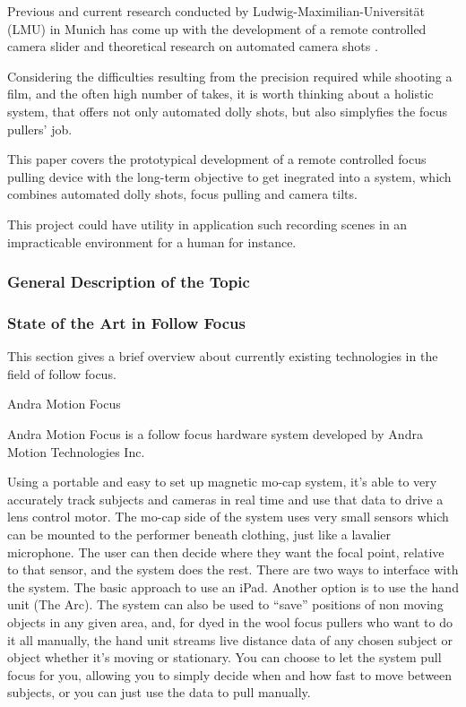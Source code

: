 \documentclass{sigchi}
\begin{document}
Previous and current research conducted by Ludwig-Maximilian-Universit\"at (LMU) in Munich has come up with the development of a remote controlled camera slider \cite{pmoerwald} and theoretical research on automated camera shots \cite{pburgdorf}. 

Considering the difficulties resulting from the precision required while shooting a film, and the often high number of takes, it is worth thinking about a holistic system, that offers not only automated dolly shots, but also simplyfies the focus pullers' job. 

This paper covers the prototypical development of a remote controlled focus pulling device with the long-term objective to get inegrated into a system, which combines automated dolly shots, focus pulling and camera tilts.

This project could have utility in application such recording scenes in an impracticable environment for a human for instance.


\subsubsection{General Description of the Topic}

\subsubsection{State of the Art in Follow Focus}

This section gives a brief overview about currently existing technologies in the field of follow focus. 

Andra Motion Focus

Andra Motion Focus is a follow focus hardware system developed by Andra Motion Technologies Inc. 

Using a portable and easy to set up magnetic mo-cap system, it’s able to very accurately track subjects and cameras in real time and use that data to drive a lens control motor.  The mo-cap side of the system uses very small sensors which can be mounted to the performer beneath clothing, just like a lavalier microphone. The user can then decide where they want the focal point, relative to that sensor, and the system does the rest. 
There are two ways to interface with the system. The basic approach to use an iPad. Another option is to use the hand unit (The Arc).
The system can also be used to “save” positions of non moving objects in any given area, and, for dyed in the wool focus pullers who want to do it all manually, the hand unit streams live distance data of any chosen subject or object whether it’s moving or stationary.  You can choose to let the system pull focus for you, allowing you to simply decide when and how fast to move between subjects, or you can just use the data to pull manually.
\end{document}
